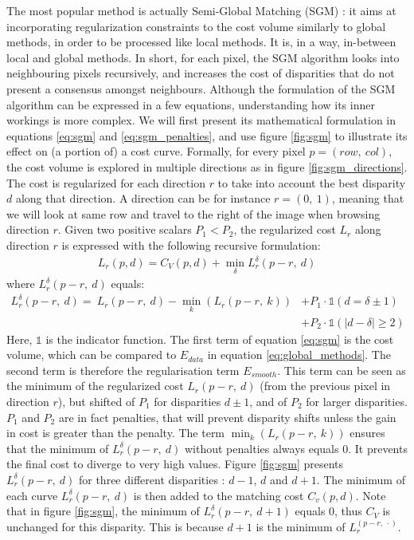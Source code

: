 The most popular method is actually Semi-Global Matching (SGM) \cite{hirschmuller_accurate_2005}: it aims at incorporating regularization constraints to the cost volume similarly to global methods, in order to be processed like local methods. It is, in a way, in-between local and global methods. In short, for each pixel, the SGM algorithm looks into neighbouring pixels recursively, and increases the cost of disparities that do not present a consensus amongst neighbours. Although the formulation of the SGM algorithm can be expressed in a few equations, understanding how its inner workings is more complex. We will first present its mathematical formulation in equations \eqref{eq:sgm} and \eqref{eq:sgm_penalties}, and use figure \ref{fig:sgm} to illustrate its effect on (a portion of) a cost curve. Formally, for every pixel $p=(row, ~col)$, the cost volume is explored in multiple directions as in figure \ref{fig:sgm_directions}. The cost is regularized for each direction $r$ to take into account the best disparity $d$ along that direction. A direction can be for instance $r=(0,~1)$, meaning that we will look at same row and travel to the right of the image when browsing direction $r$. Given two positive scalars $P_1<P_2$, the regularized cost $L_r$ along direction $r$ is expressed with the following recursive formulation:
\begin{align}\label{eq:sgm}
    L_r(p,d)=C_V(p,d)+\min_\delta L_r^\delta(p-r,~d)
\end{align}
where $L_r^\delta(p-r,~d)$ equals:
\begin{align}
    L_r^\delta(p-r,~d) = ~L_r(p-r,~d)-\min_k(L_r(p-r,~k))&+P_1\cdot\mathds{1}(d=\delta\pm 1)\nonumber\\
    &+P_2\cdot\mathds{1}(|d-\delta|\geqslant 2)\label{eq:sgm_penalties}
\end{align}
Here, $\mathds{1}$ is the indicator function. The first term of equation \eqref{eq:sgm} is the cost volume, which can be compared to $E_{data}$ in equation \eqref{eq:global_methods}. The second term is therefore the regularisation term $E_{smooth}$. This term can be seen as the minimum of the regularized cost $L_r(p-r, ~d)$ (from the previous pixel in direction $r$), but shifted of $P_1$ for disparities $d\pm1$, and of $P_2$ for larger disparities. $P_1$ and $P_2$ are in fact penalties, that will prevent disparity shifts unless the gain in cost is greater than the penalty. The term $\min_k(L_r(p-r,~k))$ ensures that the minimum of $L_r^\delta(p-r,~d)$ without penalties always equals $0$. It prevents the final cost to diverge to very high values. Figure \ref{fig:sgm} presents $L_r^\delta(p-r,~d)$ for three different disparities : $d-1$, $d$ and $d+1$. The minimum of each curve $L_r^\delta(p-r,~d)$ is then added to the matching cost $C_v(p,d)$. Note that in figure \ref{fig:sgm}, the minimum of $L_r^\delta(p-r,~d+1)$ equals $0$, thus $C_V$ is unchanged for this disparity. This is because $d+1$ is the minimum of $L_r^(p-r,~\cdot)$. 

